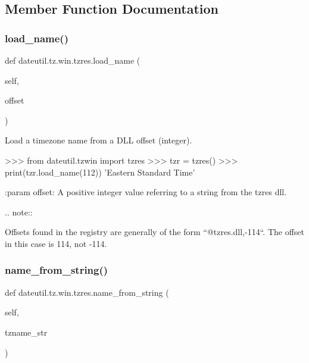 \subsection{Member Function Documentation}
\mbox{\label{classdateutil_1_1tz_1_1win_1_1tzres_ae0b251cf7df2f866b241b669577f0b3b}} 
\subsubsection{\texorpdfstring{load\+\_\+name()}{load\_name()}}
{\footnotesize\ttfamily def dateutil.\+tz.\+win.\+tzres.\+load\+\_\+name (\begin{DoxyParamCaption}\item[{}]{self,  }\item[{}]{offset }\end{DoxyParamCaption})}

\begin{DoxyVerb}Load a timezone name from a DLL offset (integer).

>>> from dateutil.tzwin import tzres
>>> tzr = tzres()
>>> print(tzr.load_name(112))
'Eastern Standard Time'

:param offset:
    A positive integer value referring to a string from the tzres dll.

.. note::

    Offsets found in the registry are generally of the form
    ``@tzres.dll,-114``. The offset in this case is 114, not -114.\end{DoxyVerb}
 \mbox{\label{classdateutil_1_1tz_1_1win_1_1tzres_ab740cc88e4c9c39bc0b4ce707a256ea0}} 
\subsubsection{\texorpdfstring{name\+\_\+from\+\_\+string()}{name\_from\_string()}}
{\footnotesize\ttfamily def dateutil.\+tz.\+win.\+tzres.\+name\+\_\+from\+\_\+string (\begin{DoxyParamCaption}\item[{}]{self,  }\item[{}]{tzname\+\_\+str }\end{DoxyParamCaption})}


